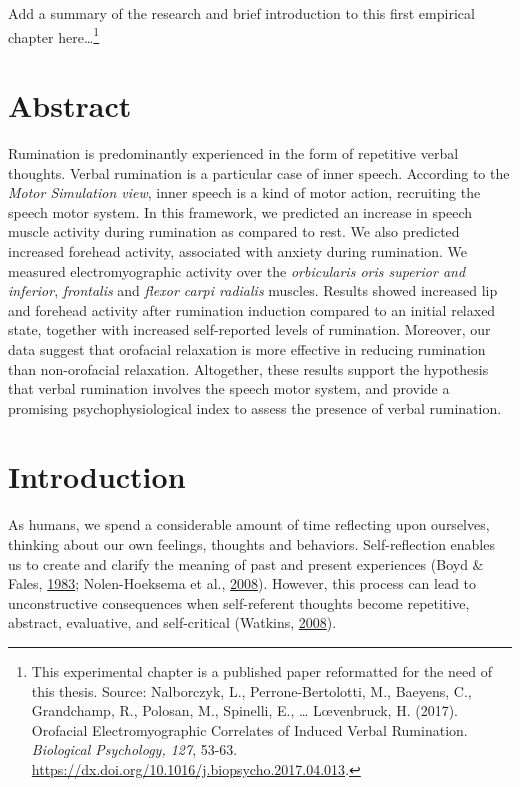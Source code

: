 \documentclass[a4paper,12pt,twoside,openright,oldfontcommands]{memoir}
\let\rmarkdownfootnote\footnote%
\def\footnote{\protect\rmarkdownfootnote}
\newcommand{\initial}[1]{
	\lettrine[lines=3,lhang=0.33,nindent=0em]{
		\color{gray}
     		{\textsc{#1}}}{}}
\begin{document}
\initial{A}dd a summary of the research and brief introduction to this first empirical chapter here\ldots{}\footnote{This experimental chapter is a published paper reformatted for the need of this thesis. Source: Nalborczyk, L., Perrone-Bertolotti, M., Baeyens, C., Grandchamp, R., Polosan, M., Spinelli, E., \ldots{} L\oe venbruck, H. (2017). Orofacial Electromyographic Correlates of Induced Verbal Rumination. \emph{Biological Psychology, 127}, 53-63. \url{https://dx.doi.org/10.1016/j.biopsycho.2017.04.013}.}

\hypertarget{abstract}{%
\section{Abstract}\label{abstract}}

Rumination is predominantly experienced in the form of repetitive verbal thoughts. Verbal rumination is a particular case of inner speech. According to the \emph{Motor Simulation view}, inner speech is a kind of motor action, recruiting the speech motor system. In this framework, we predicted an increase in speech muscle activity during rumination as compared to rest. We also predicted increased forehead activity, associated with anxiety during rumination. We measured electromyographic activity over the \emph{orbicularis oris superior and inferior}, \emph{frontalis} and \emph{flexor carpi radialis} muscles. Results showed increased lip and forehead activity after rumination induction compared to an initial relaxed state, together with increased self-reported levels of rumination. Moreover, our data suggest that orofacial relaxation is more effective in reducing rumination than non-orofacial relaxation. Altogether, these results support the hypothesis that verbal rumination involves the speech motor system, and provide a promising psychophysiological index to assess the presence of verbal rumination.

\hypertarget{introduction}{%
\section{Introduction}\label{introduction}}

As humans, we spend a considerable amount of time reflecting upon ourselves, thinking about our own feelings, thoughts and behaviors. Self-reflection enables us to create and clarify the meaning of past and present experiences (Boyd \& Fales, \protect\hyperlink{ref-boyd_reflective_1983}{1983}; Nolen-Hoeksema et al., \protect\hyperlink{ref-Nolen-Hoeksema2008}{2008}). However, this process can lead to unconstructive consequences when self-referent thoughts become repetitive, abstract, evaluative, and self-critical (Watkins, \protect\hyperlink{ref-Watkins2008}{2008}).
\end{document}

